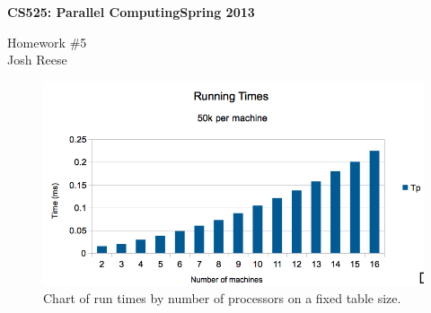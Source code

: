 \documentclass[11pt]{article}
\begin{document}
 \thispagestyle{empty}

 \noindent \textbf{CS525: Parallel Computing\hspace*{\fill}Spring 2013} 
 \begin{center}
   {\LARGE Homework \#5\\\small Josh Reese}\\
 \end{center}
 \begin{figure}[h]
   \centering
   \includegraphics[width=\textwidth]{graph.png}
   \caption{Chart of run times by number of processors on a fixed
     table size.}
 \end{figure}
\end{document}
